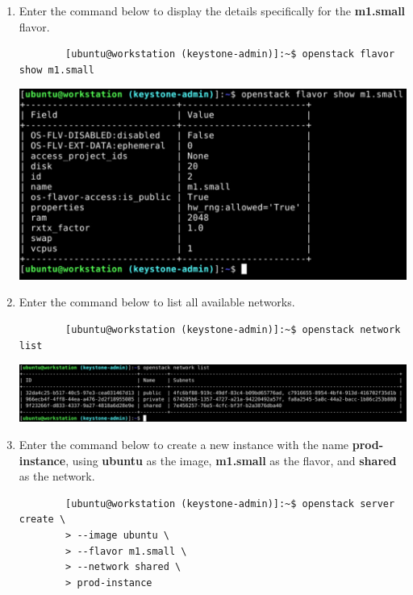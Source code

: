 \documentclass[letterpaper, 12pt]{article}
\begin{document}
\begin{enumerate}
    \item Enter the command below to display the details specifically for the \textbf{m1.small} flavor.
    \begin{lstlisting}
        [ubuntu@workstation (keystone-admin)]:~$ openstack flavor show m1.small
    \end{lstlisting}

    \begin{center}
        \includegraphics[width=\linewidth]{images/part2/step5.png}
    \end{center}

    \item Enter the command below to list all available networks.
    \begin{lstlisting}
        [ubuntu@workstation (keystone-admin)]:~$ openstack network list
    \end{lstlisting}

    \begin{center}
        \includegraphics[width=\linewidth]{images/part2/step6.png}
    \end{center}

    \item Enter the command below to create a new instance with the name \textbf{prod-instance}, using \textbf{ubuntu} as the image, \textbf{m1.small} as the flavor, and \textbf{shared} as the network.
    \begin{lstlisting}
        [ubuntu@workstation (keystone-admin)]:~$ openstack server create \
        > --image ubuntu \
        > --flavor m1.small \
        > --network shared \
        > prod-instance
    \end{lstlisting}


\end{enumerate}
\end{document}
